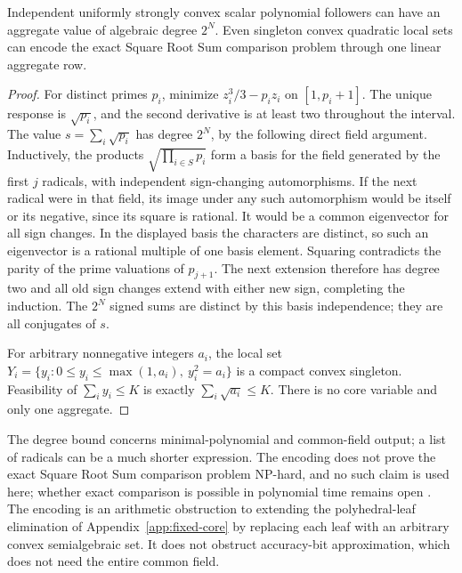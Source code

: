 \begin{proposition}\label{prop:root-sum-degree}
Independent uniformly strongly convex scalar polynomial followers can have an
aggregate value of algebraic degree \(2^N\). Even singleton convex quadratic
local sets can encode the exact Square Root Sum comparison problem through
one linear aggregate row.
\end{proposition}
\begin{proof}
For distinct primes \(p_i\), minimize \(z_i^3/3-p_i z_i\) on \([1,p_i+1]\).
The unique response is \(\sqrt{p_i}\), and the second derivative is at least
two throughout the interval. The value \(s=\sum_i\sqrt{p_i}\) has degree
\(2^N\), by the following direct field argument. Inductively, the products
\(\sqrt{\prod_{i\in S}p_i}\) form a basis for the field generated by the first
\(j\) radicals, with independent sign-changing automorphisms. If the next
radical were in that field, its image under any such automorphism would be
itself or its negative, since its square is rational. It would be a common
eigenvector for all sign changes. In the displayed basis the characters are
distinct, so such an eigenvector is a rational multiple of one basis element.
Squaring contradicts the parity of the prime valuations of \(p_{j+1}\).
The next extension therefore has degree two and all old sign changes extend
with either new sign, completing the induction. The \(2^N\) signed sums are
distinct by this basis independence; they are all conjugates of \(s\).

For arbitrary nonnegative integers \(a_i\), the local set
\(Y_i=\{y_i:0\le y_i\le\max(1,a_i),\ y_i^2=a_i\}\) is a compact convex
singleton. Feasibility of \(\sum_i y_i\le K\) is exactly
\(\sum_i\sqrt{a_i}\le K\). There is no core variable and only one aggregate.
\end{proof}
The degree bound concerns minimal-polynomial and common-field output;
a list of radicals can be a much shorter expression. The encoding does not
prove the exact Square Root Sum comparison problem NP-hard, and no such claim is used here;
whether exact comparison is possible in polynomial time remains open
\citep{EisenbrandEtAl2024}. The encoding is an arithmetic obstruction to
extending the polyhedral-leaf elimination of Appendix~\ref{app:fixed-core} by
replacing each leaf with an arbitrary convex semialgebraic set. It does not
obstruct accuracy-bit approximation, which does not need the entire common
field.
